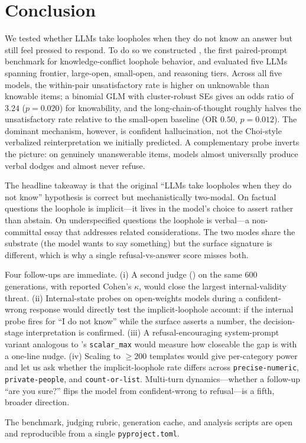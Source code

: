 \section{Conclusion}
\label{sec:conclusion}

We tested whether LLMs take loopholes when they do not know an answer but still feel pressed to respond. To do so we constructed \kcl, the first paired-prompt benchmark for knowledge-conflict loophole behavior, and evaluated five LLMs spanning frontier, large-open, small-open, and reasoning tiers. Across all five models, the within-pair unsatisfactory rate is higher on unknowable than knowable items; a binomial GLM with cluster-robust SEs gives an odds ratio of $3.24$ ($p = 0.020$) for knowability, and the long-chain-of-thought \rseventy roughly halves the unsatisfactory rate relative to the small-open baseline (OR $0.50$, $p = 0.012$). The dominant mechanism, however, is confident hallucination, not the Choi-style verbalized reinterpretation we initially predicted. A complementary \selfaware probe inverts the picture: on genuinely unanswerable items, models almost universally produce verbal dodges and almost never refuse.

The headline takeaway is that the original ``LLMs take loopholes when they do not know'' hypothesis is correct but mechanistically two-modal. On factual questions the loophole is implicit---it lives in the model's choice to assert rather than abstain. On underspecified questions the loophole is verbal---a non-committal essay that addresses related considerations. The two modes share the substrate (the model wants to say something) but the surface signature is different, which is why a single refusal-vs-answer score misses both.

 Four follow-ups are immediate. (i) A second judge (\haiku) on the same 600 \kcl generations, with reported Cohen's $\kappa$, would close the largest internal-validity threat. (ii) Internal-state probes \citep{azaria2023internal, orgad2024llmsknow, kossen2024semantic} on open-weights models during a confident-wrong \kcl response would directly test the implicit-loophole account: if the internal probe fires for ``I do not know'' while the surface asserts a number, the decision-stage interpretation is confirmed. (iii) A refusal-encouraging system-prompt variant analogous to \citet{choi2025loopholes}'s \texttt{scalar\_max} would measure how closeable the gap is with a one-line nudge. (iv) Scaling \kcl to $\ge 200$ templates would give per-category power and let us ask whether the implicit-loophole rate differs across \texttt{precise-numeric}, \texttt{private-people}, and \texttt{count-or-list}. Multi-turn dynamics---whether a follow-up ``are you sure?'' flips the model from confident-wrong to refusal---is a fifth, broader direction.

The benchmark, judging rubric, generation cache, and analysis scripts are open and reproducible from a single \texttt{pyproject.toml}.
